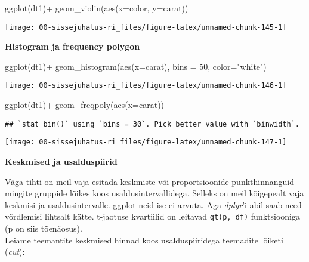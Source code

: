 \documentclass[
]{book}
\newenvironment{Shaded}{\begin{snugshade}}{\end{snugshade}}
\newcommand{\AttributeTok}[1]{\textcolor[rgb]{0.77,0.63,0.00}{#1}}
\newcommand{\DecValTok}[1]{\textcolor[rgb]{0.00,0.00,0.81}{#1}}
\newcommand{\FunctionTok}[1]{\textcolor[rgb]{0.00,0.00,0.00}{#1}}
\newcommand{\NormalTok}[1]{#1}
\newcommand{\SpecialCharTok}[1]{\textcolor[rgb]{0.00,0.00,0.00}{#1}}
\newcommand{\StringTok}[1]{\textcolor[rgb]{0.31,0.60,0.02}{#1}}
\begin{document}
\begin{Shaded}
\begin{Highlighting}[]
\FunctionTok{ggplot}\NormalTok{(dt1)}\SpecialCharTok{+}
  \FunctionTok{geom\_violin}\NormalTok{(}\FunctionTok{aes}\NormalTok{(}\AttributeTok{x=}\NormalTok{color, }\AttributeTok{y=}\NormalTok{carat))}
\end{Highlighting}
\end{Shaded}

\begin{center}\texttt{[image: 00-sissejuhatus-ri\_files/figure-latex/unnamed-chunk-145-1]} \end{center}

\textbf{Histogram ja frequency polygon}

\begin{Shaded}
\begin{Highlighting}[]
\FunctionTok{ggplot}\NormalTok{(dt1)}\SpecialCharTok{+}
  \FunctionTok{geom\_histogram}\NormalTok{(}\FunctionTok{aes}\NormalTok{(}\AttributeTok{x=}\NormalTok{carat), }\AttributeTok{bins =} \DecValTok{50}\NormalTok{, }\AttributeTok{color=}\StringTok{"white"}\NormalTok{)}
\end{Highlighting}
\end{Shaded}

\begin{center}\texttt{[image: 00-sissejuhatus-ri\_files/figure-latex/unnamed-chunk-146-1]} \end{center}

\begin{Shaded}
\begin{Highlighting}[]
\FunctionTok{ggplot}\NormalTok{(dt1)}\SpecialCharTok{+}
  \FunctionTok{geom\_freqpoly}\NormalTok{(}\FunctionTok{aes}\NormalTok{(}\AttributeTok{x=}\NormalTok{carat))}
\end{Highlighting}
\end{Shaded}

\begin{verbatim}
## `stat_bin()` using `bins = 30`. Pick better value with `binwidth`.
\end{verbatim}

\begin{center}\texttt{[image: 00-sissejuhatus-ri\_files/figure-latex/unnamed-chunk-147-1]} \end{center}

\textbf{Keskmised ja usalduspiirid}

Väga tihti on meil vaja esitada keskmiste või proportsioonide punkthinnanguid mingite gruppide lõikes koos usaldusintervallidega. Selleks on meil kõigepealt vaja keskmisi ja usaldusintervalle. ggplot neid ise ei arvuta. Aga \emph{dplyr}'i abil saab need võrdlemisi lihtsalt kätte. t-jaotuse kvartiilid on leitavad \texttt{qt(p,\ df)} funktsiooniga (p on siis tõenäosus).\\
Leiame teemantite keskmised hinnad koos usalduspiiridega teemadite lõiketi (\emph{cut}):
\end{document}
